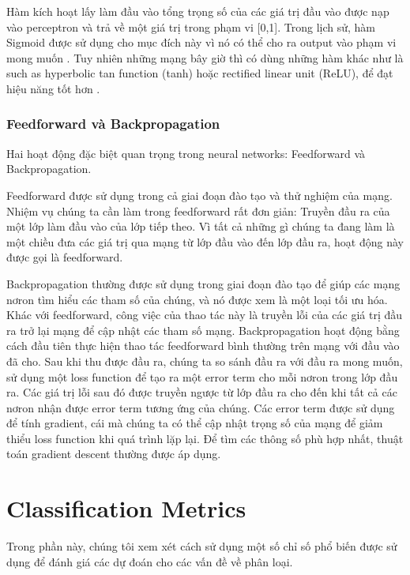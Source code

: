 Hàm kích hoạt lấy làm đầu vào tổng trọng số của các giá trị đầu vào được nạp vào perceptron và trả về một giá trị trong phạm vi [0,1]. 
Trong lịch sử, hàm Sigmoid được sử dụng cho mục đích này vì nó có thể cho ra output vào phạm vi mong muốn \cite{li2015cs231n}. 
Tuy nhiên những mạng bây giờ thì có dùng những hàm khác như là such as hyperbolic tan function (tanh) hoặc rectified linear unit (ReLU), để đạt hiệu năng tốt hơn \cite{li2015cs231n}.

\subsubsection{Feedforward và Backpropagation}

Hai hoạt động đặc biệt quan trọng trong neural networks: Feedforward và Backpropagation.

Feedforward được sử dụng trong cả giai đoạn đào tạo và thử nghiệm của mạng.
Nhiệm vụ chúng ta cần làm trong feedforward rất đơn giản: Truyền đầu ra của một lớp làm đầu vào của lớp tiếp theo.
Vì tất cả những gì chúng ta đang làm là một chiều đưa các giá trị qua mạng từ lớp đầu vào đến lớp đầu ra, hoạt động này được gọi là feedforward.

Backpropagation thường được sử dụng trong giai đoạn đào tạo để giúp các mạng nơron tìm hiểu các tham số của chúng, và nó được xem là một loại tối ưu hóa.
Khác với feedforward, công việc của thao tác này là truyền lỗi của các giá trị đầu ra trở lại mạng để cập nhật các tham số mạng.
Backpropagation hoạt động bằng cách đầu tiên thực hiện thao tác feedforward bình thường trên mạng với đầu vào đã cho.
Sau khi thu được đầu ra, chúng ta so sánh đầu ra với đầu ra mong muốn, sử dụng một loss function để tạo ra một error term cho mỗi nơron trong lớp đầu ra.
Các giá trị lỗi sau đó được truyền ngược từ lớp đầu ra cho đến khi tất cả các nơron nhận được error term tương ứng của chúng.
Các error term được sử dụng để tính gradient, cái mà chúng ta có thể cập nhật trọng số của mạng để giảm thiểu loss function khi quá trình lặp lại.
Để tìm các thông số phù hợp nhất, thuật toán gradient descent thường được áp dụng.

\section{Classification Metrics}

Trong phần này, chúng tôi xem xét cách sử dụng một số chỉ số phổ biến được sử dụng để đánh giá các dự đoán cho các vấn đề về phân loại.

